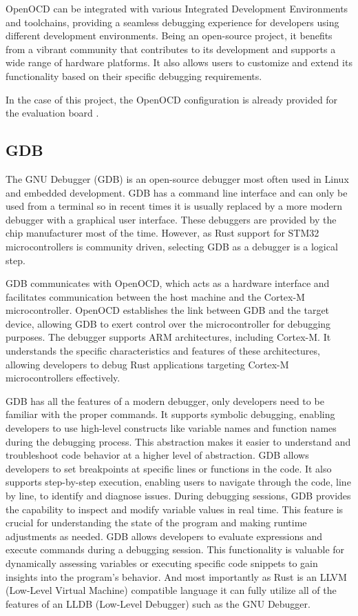 OpenOCD can be integrated with various Integrated Development Environments and toolchains, providing a seamless debugging experience for developers using different development environments. Being an open-source project, it benefits from a vibrant community that contributes to its development and supports a wide range of hardware platforms. It also allows users to customize and extend its functionality based on their specific debugging requirements.

In the case of this project, the OpenOCD configuration is already provided for the evaluation board \cite{OpenocdConfigFile}.

\subsection{GDB}

The GNU Debugger (GDB) is an open-source debugger most often used in Linux and embedded development. GDB has a command line interface and can only be used from a terminal so in recent times it is usually replaced by a more modern debugger with a graphical user interface. These debuggers are provided by the chip manufacturer most of the time. However, as Rust support for STM32 microcontrollers is community driven, selecting GDB as a debugger is a logical step.

GDB communicates with OpenOCD, which acts as a hardware interface and facilitates communication between the host machine and the Cortex-M microcontroller. OpenOCD establishes the link between GDB and the target device, allowing GDB to exert control over the microcontroller for debugging purposes. The debugger supports ARM architectures, including Cortex-M. It understands the specific characteristics and features of these architectures, allowing developers to debug Rust applications targeting Cortex-M microcontrollers effectively.

GDB has all the features of a modern debugger, only developers need to be familiar with the proper commands. It supports symbolic debugging, enabling developers to use high-level constructs like variable names and function names during the debugging process. This abstraction makes it easier to understand and troubleshoot code behavior at a higher level of abstraction. GDB allows developers to set breakpoints at specific lines or functions in the code. It also supports step-by-step execution, enabling users to navigate through the code, line by line, to identify and diagnose issues. During debugging sessions, GDB provides the capability to inspect and modify variable values in real time. This feature is crucial for understanding the state of the program and making runtime adjustments as needed. GDB allows developers to evaluate expressions and execute commands during a debugging session. This functionality is valuable for dynamically assessing variables or executing specific code snippets to gain insights into the program's behavior. And most importantly as Rust is an LLVM (Low-Level Virtual Machine) compatible language it can fully utilize all of the features of an LLDB (Low-Level Debugger) such as the GNU Debugger.

